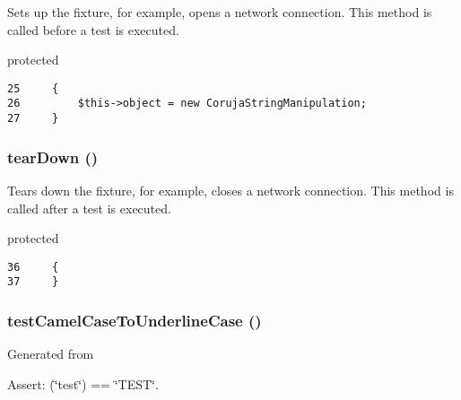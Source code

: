 Sets up the fixture, for example, opens a network connection. This method is called before a test is executed.

protected 

\begin{Code}\begin{verbatim}25     {
26         $this->object = new CorujaStringManipulation;
27     }
\end{verbatim}
\end{Code}


\hypertarget{class_coruja_string_manipulation_test_80fe3d17e658907fc75346a0ec9d6fc7}{
\subsubsection[{tearDown}]{\setlength{\rightskip}{0pt plus 5cm}tearDown ()}}
\label{class_coruja_string_manipulation_test_80fe3d17e658907fc75346a0ec9d6fc7}


Tears down the fixture, for example, closes a network connection. This method is called after a test is executed.

protected 

\begin{Code}\begin{verbatim}36     {
37     }
\end{verbatim}
\end{Code}


\hypertarget{class_coruja_string_manipulation_test_67aeee0f177c1943fda00d85a21cf72a}{
\subsubsection[{testCamelCaseToUnderlineCase}]{\setlength{\rightskip}{0pt plus 5cm}testCamelCaseToUnderlineCase ()}}
\label{class_coruja_string_manipulation_test_67aeee0f177c1943fda00d85a21cf72a}


Generated from \begin{Desc}
\item[Assert:](\char`\"{}test\char`\"{}) == \char`\"{}TEST\char`\"{}. \end{Desc}


